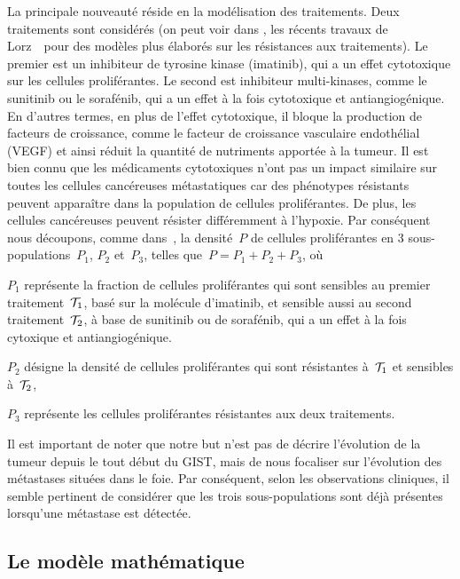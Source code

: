 \documentclass[main.tex]{subfiles}
\begin{document}
La principale nouveauté réside en la modélisation des traitements. Deux traitements sont considérés (on peut voir dans \cite{lorz2013,lorz2013populational}, les récents travaux de Lorz~\etal\ pour des modèles plus élaborés sur les résistances aux traitements). 
Le premier est un inhibiteur de tyrosine kinase (imatinib), %
qui a un effet cytotoxique 
sur les cellules proliférantes. Le second est inhibiteur multi-kinases, comme le sunitinib ou le sorafénib, qui a un effet à la fois cytotoxique et antiangiogénique. En d'autres termes, en plus de l'effet cytotoxique, il bloque la production de facteurs de croissance, comme le facteur de croissance vasculaire endothélial (VEGF) et ainsi réduit la quantité de nutriments apportée à la tumeur. 
Il est bien connu que les médicaments cytotoxiques n'ont pas un impact similaire sur toutes les cellules cancéreuses métastatiques car des phénotypes résistants peuvent apparaître dans la population de cellules proliférantes. De plus, les cellules cancéreuses peuvent résister différemment à l'hypoxie. Par conséquent nous découpons, comme dans~\cite{Bresch2009}, la densité~$P$ de cellules proliférantes en 3 sous-populations~$P_1$, $P_2$ et~$P_3$, telles  que~$P=P_1+P_2+P_3$, où
\begin{myitemize}
\item $P_1$ représente la fraction de cellules proliférantes qui sont sensibles au premier traitement~${\mathcal T_1}$, basé sur la molécule d'imatinib, et sensible aussi au second traitement~${\mathcal T_2}$, à base de sunitinib ou de sorafénib, qui a un effet à la fois cytoxique et antiangiogénique. 
\item $P_2$ désigne la densité de cellules proliférantes qui sont résistantes à~${\mathcal T_1}$ et sensibles à~${\mathcal T_2}$,
\item $P_3$ représente les cellules proliférantes résistantes aux deux traitements. 
\end{myitemize}



Il est important de noter que notre but n'est pas de décrire l'évolution de la tumeur depuis le tout début du GIST, mais de nous focaliser sur l'évolution des métastases situées dans le foie. 
Par conséquent, selon les observations cliniques, il semble pertinent de considérer que les trois sous-populations sont déjà présentes lorsqu'une métastase est détectée.

\subsection{Le modèle mathématique}
\end{document}
